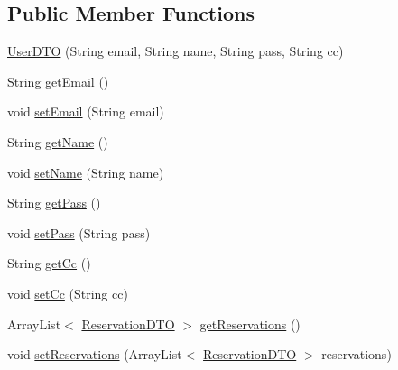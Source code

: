 \subsection*{Public Member Functions}
\begin{DoxyCompactItemize}
\item 
\mbox{\hyperlink{classbspq18__e4_1_1_gestion_hotelera_1_1server_1_1dto_1_1_user_d_t_o_a07495875c2ac2170892e2e979fbec598}{User\+D\+TO}} (String email, String name, String pass, String cc)
\item 
String \mbox{\hyperlink{classbspq18__e4_1_1_gestion_hotelera_1_1server_1_1dto_1_1_user_d_t_o_a7d0c66a30824eab252ef426bcd1ed391}{get\+Email}} ()
\item 
void \mbox{\hyperlink{classbspq18__e4_1_1_gestion_hotelera_1_1server_1_1dto_1_1_user_d_t_o_ad5c6f3cfb88737058fbfeca5542d7738}{set\+Email}} (String email)
\item 
String \mbox{\hyperlink{classbspq18__e4_1_1_gestion_hotelera_1_1server_1_1dto_1_1_user_d_t_o_a89d123eb7c7636f3aa0e4905f5fa0295}{get\+Name}} ()
\item 
void \mbox{\hyperlink{classbspq18__e4_1_1_gestion_hotelera_1_1server_1_1dto_1_1_user_d_t_o_a77f767abe9a06b0ad2fb99aace526cff}{set\+Name}} (String name)
\item 
String \mbox{\hyperlink{classbspq18__e4_1_1_gestion_hotelera_1_1server_1_1dto_1_1_user_d_t_o_ac02119df57d842b71161732b07056f50}{get\+Pass}} ()
\item 
void \mbox{\hyperlink{classbspq18__e4_1_1_gestion_hotelera_1_1server_1_1dto_1_1_user_d_t_o_a6f1c3ecf74db8ba4d825051ca9872be4}{set\+Pass}} (String pass)
\item 
String \mbox{\hyperlink{classbspq18__e4_1_1_gestion_hotelera_1_1server_1_1dto_1_1_user_d_t_o_aca6425fcd6a0e1630b1b27e56baf3227}{get\+Cc}} ()
\item 
void \mbox{\hyperlink{classbspq18__e4_1_1_gestion_hotelera_1_1server_1_1dto_1_1_user_d_t_o_a27c91e59b531c6726856d30e2db92191}{set\+Cc}} (String cc)
\item 
Array\+List$<$ \mbox{\hyperlink{classbspq18__e4_1_1_gestion_hotelera_1_1server_1_1dto_1_1_reservation_d_t_o}{Reservation\+D\+TO}} $>$ \mbox{\hyperlink{classbspq18__e4_1_1_gestion_hotelera_1_1server_1_1dto_1_1_user_d_t_o_a0129d05f7a967be4eed5091fc80566b4}{get\+Reservations}} ()
\item 
void \mbox{\hyperlink{classbspq18__e4_1_1_gestion_hotelera_1_1server_1_1dto_1_1_user_d_t_o_aa7bcd9ee107fc328a0aa79c9819e5230}{set\+Reservations}} (Array\+List$<$ \mbox{\hyperlink{classbspq18__e4_1_1_gestion_hotelera_1_1server_1_1dto_1_1_reservation_d_t_o}{Reservation\+D\+TO}} $>$ reservations)

\end{DoxyCompactItemize}
